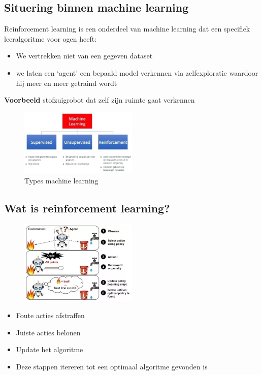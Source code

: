 \documentclass{article}
\begin{document}
\subsection{Situering binnen machine learning}

Reinforcement learning is een onderdeel van machine learning dat een
specifiek leeralgoritme voor ogen heeft:

\begin{itemize}
    \item We vertrekken niet van een gegeven dataset
    \item we laten een `agent' een bepaald model verkennen via zelfexploratie
    waardoor hij meer en meer getraind wordt
\end{itemize}

\textbf{Voorbeeld} stofzuigrobot dat zelf zijn ruimte gaat verkennen

\begin{figure}[H]
    \centering
    \includegraphics[width=0.5\textwidth]{machine-learning-types.png}
    \caption{Types machine learning}
\end{figure}

\subsection{Wat is reinforcement learning?}

\begin{figure}[H]
    \centering
    \includegraphics[width=0.5\textwidth]{reinforcement-learning.png}
\end{figure}

\begin{itemize}
    \item Foute acties afstraffen
    \item Juiste acties belonen
    \item Update het algoritme
    \item Deze stappen itereren tot een optimaal algoritme gevonden is
\end{itemize}
\end{document}
